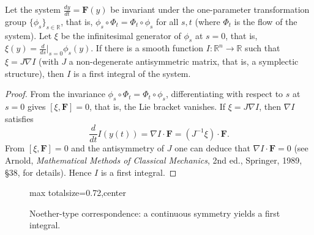 \begin{proposition}\label{prop:noether_ode}
Let the system $\frac{dy}{dt} = \mathbf{F}(y)$ be invariant under the one-parameter transformation group $\{\phi_s\}_{s \in \mathbb{R}}$, that is, $\phi_s \circ \Phi_t = \Phi_t \circ \phi_s$ for all $s, t$ (where $\Phi_t$ is the flow of the system). Let $\xi$ be the infinitesimal generator of $\phi_s$ at $s=0$, that is, $\xi(y) = \frac{d}{ds}\big|_{s=0} \phi_s(y)$. If there is a smooth function $I: \mathbb{R}^n \to \mathbb{R}$ such that $\xi = J \nabla I$ (with $J$ a non-degenerate antisymmetric matrix, that is, a symplectic structure), then $I$ is a first integral of the system.
\end{proposition}

\begin{proof}
From the invariance $\phi_s \circ \Phi_t = \Phi_t \circ \phi_s$, differentiating with respect to $s$ at $s=0$ gives $[\xi, \mathbf{F}] = 0$, that is, the Lie bracket vanishes. If $\xi = J\nabla I$, then $\nabla I$ satisfies
\[
\frac{d}{dt} I(y(t)) = \nabla I \cdot \mathbf{F} = (J^{-1}\xi) \cdot \mathbf{F}.
\]
From $[\xi, \mathbf{F}] = 0$ and the antisymmetry of $J$ one can deduce that $\nabla I \cdot \mathbf{F} = 0$ (see Arnold, \textit{Mathematical Methods of Classical Mechanics}, 2nd ed., Springer, 1989, \S{}38, for details). Hence $I$ is a first integral.
\end{proof}

\begin{figure}[htbp]
\centering
\begin{adjustbox}{max totalsize={\linewidth}{0.72\textheight},center}
\end{adjustbox}
\caption{Noether-type correspondence: a continuous symmetry yields a first integral.}
\label{fig:noether_ode}
\end{figure}

